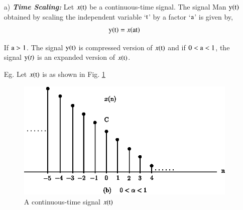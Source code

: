 \begin{itemize}
\item[{\rm a)}]{\it \bfseries Time Scaling:} Let $x(\textrm{t})$ be a continuous-time signal. The signal Man $\textrm{y}(\textrm{t})$ obtained by scaling the independent variable `$\textrm{t}$' by a factor `$\textrm{a}$' is given by,
\begin{equation}
{\textrm{y}}{(\textrm{t})}= x {(\textrm{a}\textrm{t})}\label{chap1-eq-1.34}
\end{equation}


If ${\textrm{a}} > 1$. The signal $\textrm{y}{(\textrm{t})}$ is compressed version of $x{(\textrm{t})}$ and if $0 < {\textrm{a}} < 1$, the signal $\textrm{y}{(t)}$ is an expanded version of $x{(\textrm{t})}$.

Eg. Let $x(\textrm{t})$ is as shown in Fig. \ref{chap1-fig-1.20}
\begin{figure}[H]
\centering
\includegraphics{src/chap1/fig.1.15(b).eps}
\caption{A continuous-time signal $x(\textrm{t})$}\label{chap1-fig-1.20}
\end{figure}


\end{itemize}
